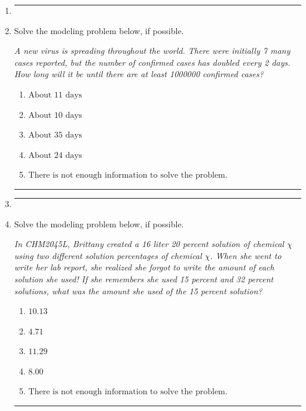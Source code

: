 \documentclass[14pt]{extbook}
\newcommand{\litem}[1]{\item#1\hspace*{-1cm}\rule{\textwidth}{0.4pt}}
\begin{document}
\begin{enumerate}
{\begin{enumerate}[label=\Alph*.]
\end{enumerate} }
\litem{
\begin{enumerate}[label=\Alph*.]

\end{enumerate} }
\litem{
Solve the modeling problem below, if possible.
\begin{center}
    \textit{ A new virus is spreading throughout the world. There were initially 7 many cases reported, but the number of confirmed cases has doubled every 2 days. How long will it be until there are at least 1000000 confirmed cases? }
\end{center}
\begin{enumerate}[label=\Alph*.]
\item \( \text{About } 11 \text{ days} \)
\item \( \text{About } 10 \text{ days} \)
\item \( \text{About } 35 \text{ days} \)
\item \( \text{About } 24 \text{ days} \)
\item \( \text{There is not enough information to solve the problem.} \)

\end{enumerate} }
\litem{
\begin{enumerate}[label=\Alph*.]

\end{enumerate} }
\litem{
Solve the modeling problem below, if possible.
\begin{center}
    \textit{ In CHM2045L, Brittany created a 16 liter 20 percent solution of chemical $\chi$ using two different solution percentages of chemical $\chi$. When she went to write her lab report, she realized she forgot to write the amount of each solution she used! If she remembers she used 15 percent and 32 percent solutions, what was the amount she used of the 15 percent solution? }
\end{center}
\begin{enumerate}[label=\Alph*.]
\item \( 10.13 \)
\item \( 4.71 \)
\item \( 11.29 \)
\item \( 8.00 \)
\item \( \text{There is not enough information to solve the problem.} \)


\end{enumerate}}
\end{enumerate}
\end{document}

